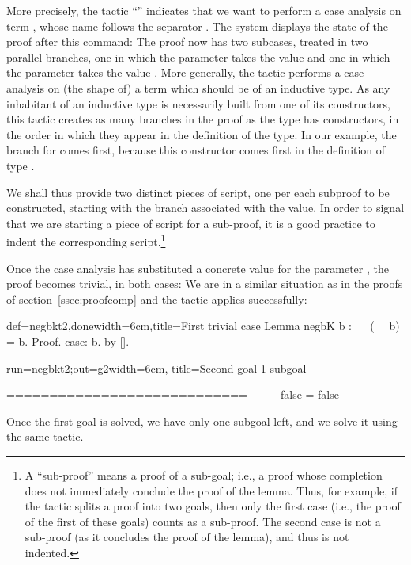 More precisely, the tactic ``'' indicates that we want to
perform a case analysis on term , whose
name follows the separator \C{:}. The \Coq{} system displays the state
of the proof after this command: The proof now has two subcases,
treated in two parallel branches, one in which the parameter 
takes the value  and one in which the parameter  takes
the value . More generally, the  tactic performs a
case analysis on (the shape of) a term  which should be of an
inductive type. As any inhabitant of an inductive type is necessarily
built from one of its constructors, this tactic creates as many
branches in the proof as the type has constructors, in the order in
which they appear in the definition of the type. In our example, the
branch for  comes first, because this constructor comes first
in the definition of type .

We shall thus provide two distinct pieces of
script, one per each subproof to be constructed,
starting with the branch associated with the  value. In order
to signal that we are starting a piece of script for a sub-proof, it
is a good practice to indent the corresponding script.\footnote{A
``sub-proof'' means a proof of a sub-goal; i.e., a proof whose
completion does not immediately conclude the proof of the lemma. Thus,
for example, if the  tactic splits a proof into two goals,
then only the first case (i.e., the proof of the first of these goals)
counts as a sub-proof. The second case is not a sub-proof (as it
concludes the proof of the lemma), and thus is not indented.}

Once the case analysis has substituted a concrete value for the
parameter , the proof becomes trivial, in both cases: We are in a
similar situation as in the proofs of section~\ref{ssec:proofcomp} and
the tactic  applies successfully:

\begin{coq}{def=negbkt2,done}{width=6cm,title=First trivial case}
Lemma negbK b : ~~ (~~ b) = b.
Proof.
case: b.
  by [].
\end{coq}
\begin{coqout}{run=negbkt2;out=g2}{width=6cm, title=Second goal}
1 subgoal

 ============================
   ~~ ~~ false = false
\end{coqout}

Once the first goal is solved, we have only one subgoal left, and
we solve it using the same tactic.

